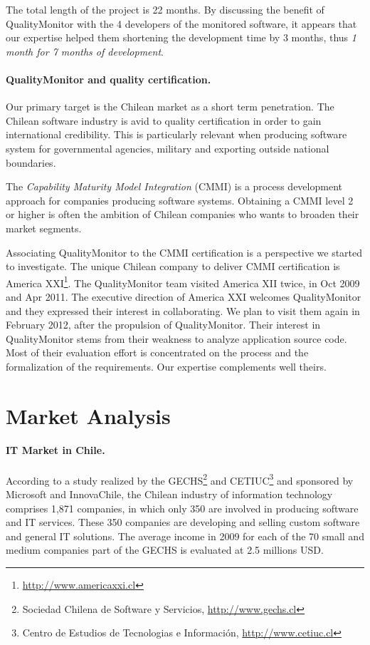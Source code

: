 \documentclass[runningheads]{llncs}
\begin{document}
The total length of the project is 22 months. By discussing the benefit of QualityMonitor with the 4 developers of the monitored software, it appears that our expertise helped them shortening the development time by 3 months, thus \emph{1 month for 7 months of development}.

\paragraph{QualityMonitor and quality certification.}
Our primary target is the Chilean market as a short term penetration. The Chilean software industry is avid to quality certification in order to gain international credibility. This is particularly relevant when producing software system for governmental agencies, military and exporting outside national boundaries.

The \emph{Capability Maturity Model Integration} (CMMI) is a process development approach for companies producing software systems. Obtaining a CMMI level 2 or higher is often the ambition of Chilean companies who wants to broaden their market segments.

Associating QualityMonitor to the CMMI certification is a perspective we started to investigate. The unique Chilean company to deliver CMMI certification is America XXI\footnote{\url{http://www.americaxxi.cl}}. The QualityMonitor team visited America XII twice, in Oct 2009 and Apr 2011. The executive direction of America XXI welcomes QualityMonitor and they expressed their interest in collaborating. We plan to visit them again in February 2012, after the propulsion of QualityMonitor. Their interest in QualityMonitor stems from their weakness to analyze application source code. Most of their evaluation effort is concentrated on the process and the formalization of the requirements. Our expertise complements well theirs.



\section{Market Analysis}

\paragraph{IT Market in Chile.}
According to a study realized by the GECHS\footnote{Sociedad Chilena de Software y Servicios, \url{http://www.gechs.cl}} and CETIUC\footnote{Centro de Estudios de Tecnologias e Informaci\'on, \url{http://www.cetiuc.cl}} and sponsored by Microsoft and InnovaChile, the Chilean industry of information technology comprises 1,871 companies, in which only 350 are involved in producing software and IT services. These 350 companies are developing and selling custom software and general IT solutions. 
The average income in 2009 for each of the 70 small and medium companies part of the GECHS is evaluated at 2.5 millions USD.
\end{document}

